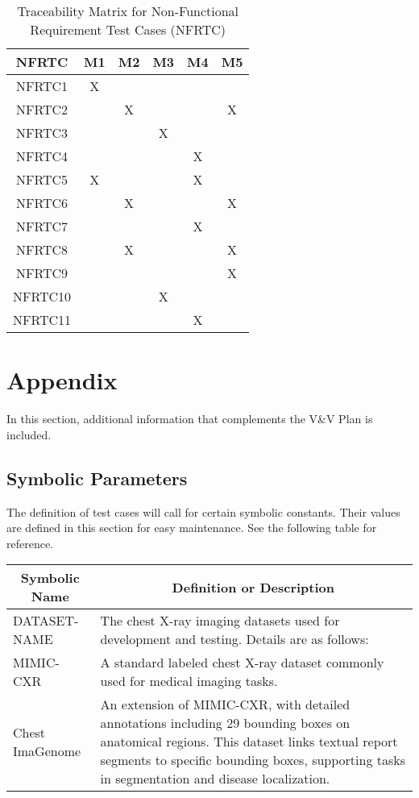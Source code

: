 \documentclass[12pt, titlepage]{article}
\begin{document}
\begin{table}[h!]
  \centering
  \caption{Traceability Matrix for Non-Functional Requirement Test Cases (NFRTC)}
  \begin{tabular}{|c|c|c|c|c|c|}
    \hline
    \textbf{NFRTC} & \textbf{M1} & \textbf{M2} & \textbf{M3} & \textbf{M4} & \textbf{M5} \\
    \hline
    NFRTC1 & X &  &  &  &  \\
    \hline
    NFRTC2 &  & X &  &  & X \\
    \hline
    NFRTC3 &  &  & X &  &  \\
    \hline
    NFRTC4 &  &  &  & X &  \\
    \hline
    NFRTC5 & X &  &  & X &  \\
    \hline
    NFRTC6 &  & X &  &  & X \\
    \hline
    NFRTC7 &  &  &  & X &  \\
    \hline
    NFRTC8 &  & X &  &  & X \\
    \hline
    NFRTC9 &  &  &  &  & X \\
    \hline
    NFRTC10 &  &  & X &  &  \\
    \hline
    NFRTC11 &  &  &  & X &  \\
    \hline
  \end{tabular}
\end{table}

\pagebreak
\newpage

\section{Appendix}
In this section, additional information that complements the V\&V Plan is included.

\subsection{Symbolic Parameters}
The definition of test cases will call for certain symbolic constants. Their values are defined in this section for easy maintenance. See the following table for reference.

\begin{table}[h]
  \centering
  \begin{tabular}{|p{}|p{}|}
    \hline
    \multicolumn{1}{|c|}{\textbf{Symbolic Name}} & \multicolumn{1}{c|}{\textbf{Definition or Description}} \\ \hline
    DATASET-NAME & The chest X-ray imaging datasets used for development and testing. Details are as follows: \\ \hline
    MIMIC-CXR & A standard labeled chest X-ray dataset commonly used for medical imaging tasks. \\ \hline
    Chest ImaGenome & An extension of MIMIC-CXR, with detailed annotations including 29 bounding boxes on anatomical regions. This dataset links textual report segments to specific bounding boxes, supporting tasks in segmentation and disease localization. \\ \hline
  \end{tabular}
\end{table}
\end{document}
